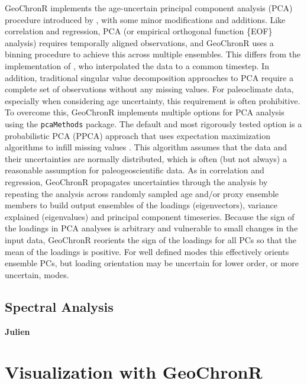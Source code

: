 \documentclass[gc, manuscript]{copernicus}
\begin{document}
GeoChronR implements the age-uncertain principal component analysis (PCA) procedure introduced by \citet{anchukaitis2013mceof}, with some minor modifications and additions.
Like correlation and regression, PCA (or empirical orthogonal function \{EOF\} analysis) requires temporally aligned observations, and GeoChronR uses a binning procedure to achieve this across multiple ensembles.
This differs from the implementation of \citet{anchukaitis2013mceof}, who interpolated the data to a common timestep.
In addition, traditional singular value decomposition approaches to PCA require a complete set of observations without any missing values.
For paleoclimate data, especially when considering age uncertainty, this requirement is often prohibitive.
To overcome this, GeoChronR implements multiple options for PCA analysis using the \texttt{pcaMethods} package.
The default and most rigorously tested option is a probabilistic PCA (PPCA) approach that uses expectation maximization algorithms to infill missing values \citep{roweis1998algorithms}.
This algorithm assumes that the data and their uncertainties are normally distributed, which is often (but not always) a reasonable assumption for paleogeoscientific data.
As in correlation and regression, GeoChronR propagates uncertainties through the analysis by repeating the analysis across randomly sampled age and/or proxy ensemble members to build output ensembles of the loadings (eigenvectors), variance explained (eigenvalues) and principal component timeseries.
Because the sign of the loadings in PCA analyses is arbitrary and vulnerable to small changes in the input data, GeoChronR reorients the sign of the loadings for all PCs so that the mean of the loadings is positive.
For well defined modes this effectively orients ensemble PCs, but loading orientation may be uncertain for lower order, or more uncertain, modes.

\subsection{Spectral Analysis}

\textbf{Julien}

\hypertarget{sec:visualization}{%
\section{Visualization with GeoChronR}\label{sec:visualization}}
\end{document}
